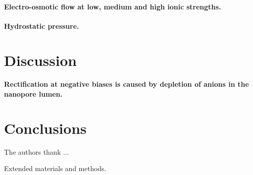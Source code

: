 \documentclass[journal=ancac3, manuscript=article, etalmode=truncate,maxauthors=0]{achemso}
\begin{document}
\paragraph{Electro-osmotic flow at low, medium and high ionic strengths.}
\paragraph{Hydrostatic pressure.}



\section{Discussion}\label{sect:discussion}

\paragraph{Rectification at negative biases is caused by depletion of anions in the nanopore lumen.}

\section{Conclusions}\label{sect:conclusions}

\begin{acknowledgement}
The authors thank ...
\end{acknowledgement}


\begin{suppinfo}
	Extended materials and methods.
\end{suppinfo}


\newpage %


\newpage






%
\end{document}
